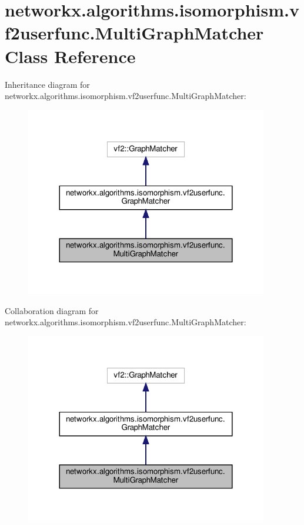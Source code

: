 \hypertarget{classnetworkx_1_1algorithms_1_1isomorphism_1_1vf2userfunc_1_1MultiGraphMatcher}{}\section{networkx.\+algorithms.\+isomorphism.\+vf2userfunc.\+Multi\+Graph\+Matcher Class Reference}
\label{classnetworkx_1_1algorithms_1_1isomorphism_1_1vf2userfunc_1_1MultiGraphMatcher}


Inheritance diagram for networkx.\+algorithms.\+isomorphism.\+vf2userfunc.\+Multi\+Graph\+Matcher\+:
\nopagebreak
\begin{figure}[H]
\begin{center}
\leavevmode
\includegraphics[width=300pt]{classnetworkx_1_1algorithms_1_1isomorphism_1_1vf2userfunc_1_1MultiGraphMatcher__inherit__graph}
\end{center}
\end{figure}


Collaboration diagram for networkx.\+algorithms.\+isomorphism.\+vf2userfunc.\+Multi\+Graph\+Matcher\+:
\nopagebreak
\begin{figure}[H]
\begin{center}
\leavevmode
\includegraphics[width=300pt]{classnetworkx_1_1algorithms_1_1isomorphism_1_1vf2userfunc_1_1MultiGraphMatcher__coll__graph}
\end{center}
\end{figure}
